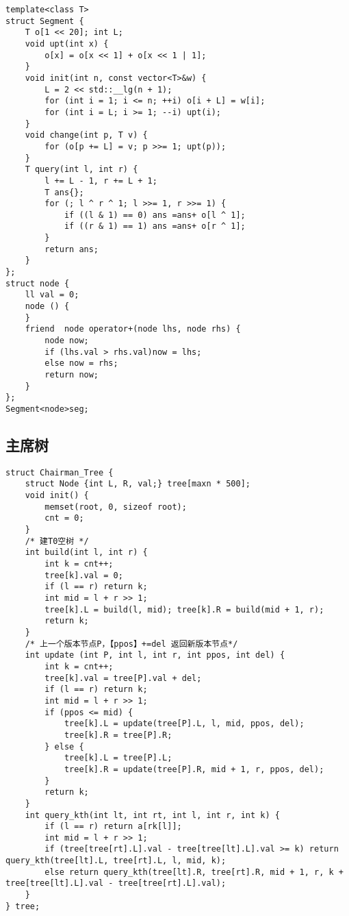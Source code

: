 \documentclass[a4paper,10pt]{article}
\begin{document}
\noindent\begin{lstlisting}
template<class T>
struct Segment {
    T o[1 << 20]; int L;
    void upt(int x) {
        o[x] = o[x << 1] + o[x << 1 | 1];
    }
    void init(int n, const vector<T>&w) {
        L = 2 << std::__lg(n + 1);
        for (int i = 1; i <= n; ++i) o[i + L] = w[i];
        for (int i = L; i >= 1; --i) upt(i);
    }
    void change(int p, T v) {
        for (o[p += L] = v; p >>= 1; upt(p));
    }
    T query(int l, int r) {
        l += L - 1, r += L + 1;
        T ans{};
        for (; l ^ r ^ 1; l >>= 1, r >>= 1) {
            if ((l & 1) == 0) ans =ans+ o[l ^ 1];
            if ((r & 1) == 1) ans =ans+ o[r ^ 1];
        }
        return ans;
    }
};
struct node {
    ll val = 0;
    node () {
    }
    friend  node operator+(node lhs, node rhs) {
        node now;
        if (lhs.val > rhs.val)now = lhs;
        else now = rhs;
        return now;
    }
};
Segment<node>seg;\end{lstlisting}

\subsection{主席树}
\thispagestyle{fancy}

\noindent\begin{lstlisting}
struct Chairman_Tree {
    struct Node {int L, R, val;} tree[maxn * 500];
    void init() {
        memset(root, 0, sizeof root);
        cnt = 0;
    }
    /* 建T0空树 */
    int build(int l, int r) {
        int k = cnt++;
        tree[k].val = 0;
        if (l == r) return k;
        int mid = l + r >> 1;
        tree[k].L = build(l, mid); tree[k].R = build(mid + 1, r);
        return k;
    }
    /* 上一个版本节点P，【ppos】+=del 返回新版本节点*/
    int update (int P, int l, int r, int ppos, int del) {
        int k = cnt++;
        tree[k].val = tree[P].val + del;
        if (l == r) return k;
        int mid = l + r >> 1;
        if (ppos <= mid) {
            tree[k].L = update(tree[P].L, l, mid, ppos, del);
            tree[k].R = tree[P].R;
        } else {
            tree[k].L = tree[P].L;
            tree[k].R = update(tree[P].R, mid + 1, r, ppos, del);
        }
        return k;
    }
    int query_kth(int lt, int rt, int l, int r, int k) {
        if (l == r) return a[rk[l]];
        int mid = l + r >> 1;
        if (tree[tree[rt].L].val - tree[tree[lt].L].val >= k) return query_kth(tree[lt].L, tree[rt].L, l, mid, k);
        else return query_kth(tree[lt].R, tree[rt].R, mid + 1, r, k + tree[tree[lt].L].val - tree[tree[rt].L].val);
    }
} tree;\end{lstlisting}
\end{document}
